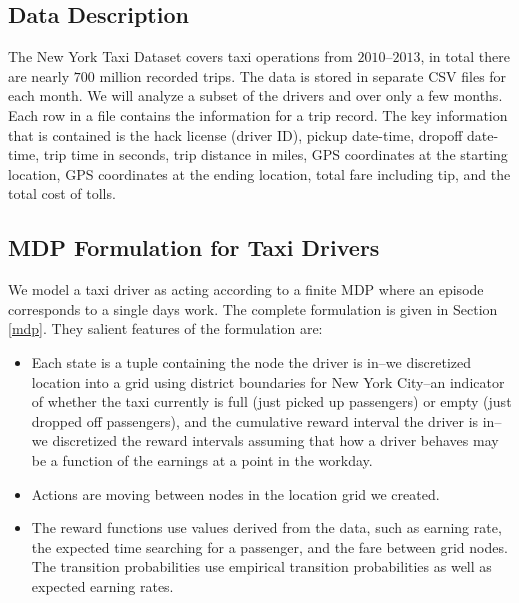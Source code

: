\documentclass{article}
\begin{document}
\subsection{Data Description}
The New York Taxi Dataset covers taxi operations from $2010$--$2013$, in total there are nearly $700$ million recorded trips. The data is stored in separate CSV files for each month. We will analyze a subset of the drivers and over only a few months. Each row in a file contains the information for a trip record. The key information that is contained is the hack license (driver ID), pickup date-time, dropoff date-time, trip time in seconds, trip distance in miles, GPS coordinates at the starting location, GPS coordinates at the ending location, total fare including tip, and the total cost of tolls.
\subsection{MDP Formulation for Taxi Drivers}
We model a taxi driver as acting according to a finite MDP where an episode corresponds to a single days work. The complete formulation is given in Section \ref{mdp}. They salient features of the formulation are:
\begin{itemize}
\item Each state is a tuple containing the node the driver is in--we discretized location into a grid using district boundaries for New York City--an indicator of whether the taxi currently is full (just picked up passengers) or empty (just dropped off passengers), and the cumulative reward interval the driver is in--we discretized the reward intervals assuming that how a driver behaves may be a function of the earnings at a point in the workday.
\item Actions are moving between nodes in the location grid we created.
\item The reward functions use values derived from the data, such as earning rate, the expected time searching for a passenger, and the fare between grid nodes. The transition probabilities use empirical transition probabilities as well as expected earning rates. 
\end{itemize}
\end{document}
